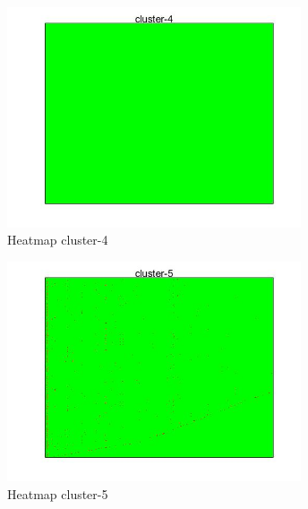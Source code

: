 \begin{figure}[htbp]
	\centering
	\includegraphics[height=6.5cm]{analisis/cluster-4.jpg}
	\caption{Heatmap cluster-4}
	\label{pic:cluster-4}
\end{figure}

\begin{figure}[htbp]
	\centering
	\includegraphics[height=6.5cm]{analisis/cluster-5.jpg}
	\caption{Heatmap cluster-5}
	\label{pic:cluster-5}
\end{figure}


